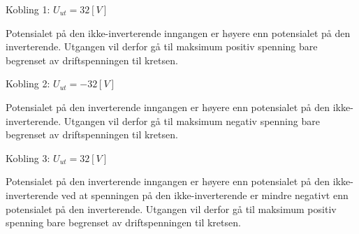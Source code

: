 
\vspace{0.5cm} %

\begin{solution}[name=Løsningsforslag oppgave]
Kobling 1: $U_{ut}=32[V]$

Potensialet på den ikke-inverterende inngangen er høyere enn potensialet på den inverterende. Utgangen vil derfor gå til maksimum positiv spenning bare begrenset av driftspenningen til kretsen.

Kobling 2: $U_{ut}=-32[V]$

Potensialet på den inverterende inngangen er høyere enn potensialet på den ikke-inverterende. Utgangen vil derfor gå til maksimum negativ spenning bare begrenset av driftspenningen til kretsen.

Kobling 3: $U_{ut}=32[V]$

Potensialet på den inverterende inngangen er høyere enn potensialet på den ikke-inverterende ved at spenningen på den ikke-inverterende er mindre negativt enn potensialet på den inverterende. Utgangen vil derfor gå til maksimum positiv spenning bare begrenset av driftspenningen til kretsen.

\end{solution}
\vspace{0.5cm} %

